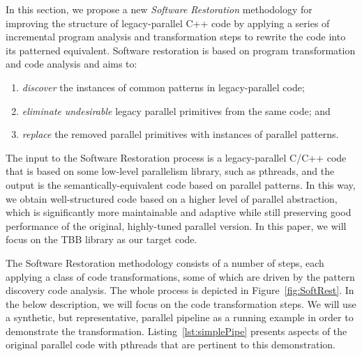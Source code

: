 \noindent
In this section, we propose a new \emph{Software Restoration} methodology %
for improving the structure of legacy-parallel C++ code by applying a series of incremental program analysis and transformation steps to rewrite the code into its patterned equivalent. %
Software restoration is based on program transformation and code analysis and aims to:
\begin{enumerate}
\item \emph{discover} the instances of common patterns in legacy-parallel code;
\item \emph{eliminate} \emph{undesirable} legacy parallel primitives from the same code; and
\item \emph{replace} the removed parallel primitives with instances of parallel patterns.
\end{enumerate}
\noindent
The input to the Software Restoration process is a legacy-parallel C/C++ code that is based on some low-level parallelism library, such as pthreads, and the output is the semantically-equivalent code based on parallel patterns. In this way, we obtain well-structured code based on a higher level of parallel abstraction, which is significantly more maintainable and adaptive while still preserving
good performance of the original, highly-tuned parallel version. In this paper, we will focus on the TBB library as our target code. 

The Software Restoration methodology consists of a number of steps, each applying a class of code transformations, some of which are driven by the pattern discovery code analysis.  The whole process is depicted in Figure~\ref{fig:SoftRest}. In the below description, we will focus on the code transformation steps. We will use a synthetic, but representative, parallel pipeline as a running example in order to demonstrate the transformation. Listing~\ref{lst:simplePipe} presents aspects of the original parallel code with pthreads that are pertinent to this demonstration.

